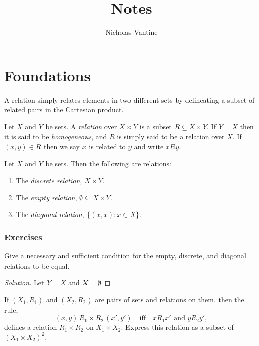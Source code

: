 \documentclass[12pt]{book}
\title{Notes}
\author{Nicholas Vantine}
\date{}
\begin{document}
\maketitle
\tableofcontents


\chapter{Foundations}


A relation simply relates elements in two different sets by delineating a subset of related pairs in the Cartesian product.

\begin{definition}
Let $X$ and $Y$ be sets. A \emph{relation} over $X \times Y$ is a subset $R \subseteq X \times Y$. If $Y = X$ then it is said to be \emph{homogeneous}, and $R$ is simply said to be a relation over $X$. If $(x,y) \in R$ then we say $x$ is related to $y$ and write $xRy$.
\end{definition}

\begin{example}
Let $X$ and $Y$ be sets. Then the following are relations:
\begin{enumerate}
    \item The \emph{discrete relation}, $X \times Y$.
    \item The \emph{empty relation}, $\emptyset \subseteq X \times Y$.
    \item The \emph{diagonal relation}, $\{(x,x) : x \in X\}$.
\end{enumerate}
\end{example}

\subsection*{Exercises}

\begin{exercise}
Give a necessary and sufficient condition for the empty, discrete, and diagonal relations to be equal.
\end{exercise}

\begin{proof}[Solution]
    Let $Y = X$ and $X = \emptyset$
\end{proof}

\begin{exercise}
If $(X_1, R_1)$ and $(X_2, R_2)$ are pairs of sets and relations on them, then the rule,
\[
(x,y) \, R_1 \times R_2 \, (x', y') \quad \text{iff} \quad xR_1x' \text{ and } yR_2y',
\]
defines a relation $R_1 \times R_2$ on $X_1 \times X_2$. Express this relation as a subset of $(X_1 \times X_2)^2$.
\end{exercise}
\end{document}
